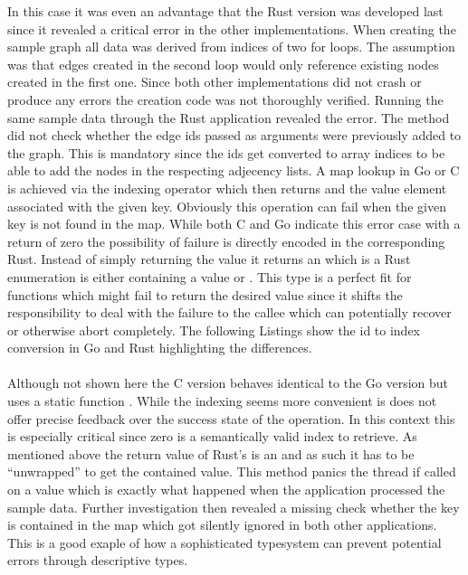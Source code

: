 In this case it was even an advantage that the Rust version was developed last since it revealed a critical error in the other implementations. When creating the sample graph all data was derived from indices of two for loops. The assumption was that edges created in the second loop would only reference existing nodes created in the first one. Since both other implementations did not crash or produce any errors the creation code was not thoroughly verified. Running the same sample data through the Rust application revealed the error. The  method did not check whether the edge ids passed as arguments were previously added to the graph. This is mandatory since the ids get converted to array indices to be able to add the nodes in the respecting adjecency lists. A map lookup in Go or C is achieved via the indexing operator which then returns and the value element associated with the given key. Obviously this operation can fail when the given key is not found in the map. While both C and Go indicate this error case with a return of zero the possibility of failure is directly encoded in the corresponding Rust. Instead of simply returning the value it returns an  which is a Rust enumeration is either containing a value or . This type is a perfect fit for functions which might fail to return the desired value since it shifts the responsibility to deal with the failure to the callee which can potentially recover or otherwise abort completely. The following Listings show the id to index conversion in Go and Rust highlighting the differences.
\\

\\


Although not shown here the C version behaves identical to the Go version but uses a static function . While the indexing seems more convenient is does not offer precise feedback over the success state of the operation. In this context this is especially critical since zero is a semantically valid index to retrieve. As mentioned above the return value of Rust's  is an  and as such it has to be ``unwrapped'' to get the contained value. This method panics the thread if called on a  value which is exactly what happened when the application processed the sample data. Further investigation then revealed a missing check whether the key is contained in the map which got silently ignored in both other applications. This is a good exaple of how a sophisticated typesystem can prevent potential errors through descriptive types.

